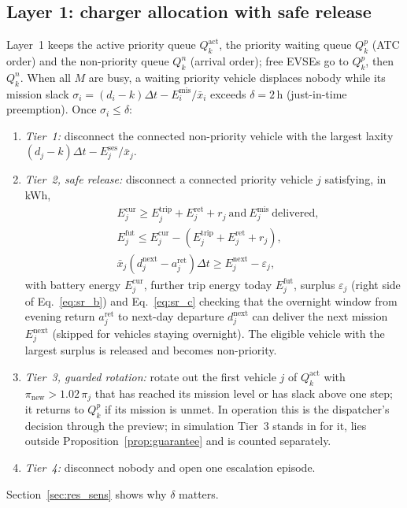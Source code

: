 \documentclass[preprint,12pt]{elsarticle}
\newcommand{\Ses}{E^{\mathrm{ses}}}
\newcommand{\Mis}{E^{\mathrm{mis}}}
\begin{document}
\subsection{Layer 1: charger allocation with safe release}
\label{sec:layer1}
Layer~1 keeps the active priority queue $Q^{\mathrm{act}}_k$, the priority waiting queue $Q^p_k$ (ATC order)
and the non-priority queue $Q^n_k$ (arrival order); free EVSEs go to $Q^p_k$, then $Q^n_k$. When all $M$ are
busy, a waiting priority vehicle displaces nobody while its mission slack
$\sigma_i=(d_i-k)\Delta t-\Mis_i/\bar{x}_i$ exceeds $\delta=2$\,h (just-in-time preemption). Once
$\sigma_i\le\delta$:
\begin{enumerate}
  \item \emph{Tier~1:} disconnect the connected non-priority vehicle with the largest laxity
  $(d_j-k)\Delta t-\Ses_j/\bar{x}_j$.
  \item \emph{Tier~2, safe release:} disconnect a connected priority vehicle $j$ satisfying, in kWh,
  \begin{align}
    &E^{\mathrm{cur}}_j\ge E^{\mathrm{trip}}_j+E^{\mathrm{ret}}_j+r_j\ \text{and}\ \Mis_j\ \text{delivered}, \label{eq:sr_a}\\
    &E^{\mathrm{fut}}_j\le E^{\mathrm{cur}}_j-(E^{\mathrm{trip}}_j+E^{\mathrm{ret}}_j+r_j), \label{eq:sr_b}\\
    &\bar{x}_j(d^{\mathrm{next}}_j-a^{\mathrm{ret}}_j)\Delta t\ge E^{\mathrm{next}}_j-\varepsilon_j, \label{eq:sr_c}
  \end{align}
  with battery energy $E^{\mathrm{cur}}_j$, further trip energy today $E^{\mathrm{fut}}_j$, surplus
  $\varepsilon_j$ (right side of Eq.~\eqref{eq:sr_b}) and Eq.~\eqref{eq:sr_c} checking that the overnight window
  from evening return $a^{\mathrm{ret}}_j$ to next-day departure $d^{\mathrm{next}}_j$ can deliver the next
  mission $E^{\mathrm{next}}_j$ (skipped for vehicles staying overnight). The eligible vehicle with the largest
  surplus is released and becomes non-priority.
  \item \emph{Tier~3, guarded rotation:} rotate out the first vehicle $j$ of $Q^{\mathrm{act}}_k$ with
  $\pi_{\mathrm{new}}>1.02\,\pi_j$ that has reached its mission level or has slack above one step; it returns
  to $Q^p_k$ if its mission is unmet. In operation this is the dispatcher's decision through the preview; in
  simulation Tier~3 stands in for it, lies outside Proposition~\ref{prop:guarantee} and is counted separately.
  \item \emph{Tier~4:} disconnect nobody and open one escalation episode.
\end{enumerate}
Section~\ref{sec:res_sens} shows why $\delta$ matters.
\end{document}
